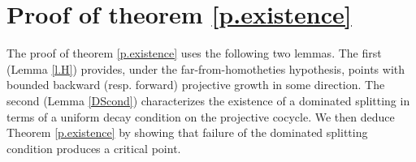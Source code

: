 \documentclass[a4paper,11pt]{article}
\theoremstyle{definition}
\def\noi{\noindent}
\begin{document}






\section{Proof of theorem \ref{p.existence}}
\label{proof-existence}


The proof of theorem \ref{p.existence}  uses the  following two lemmas. The first (Lemma \ref{l.H}) provides, under the far-from-homotheties hypothesis, points with bounded backward (resp. forward) projective growth in some direction. The second (Lemma \ref{DScond}) characterizes the existence of a dominated splitting in terms of a uniform decay condition on the projective cocycle. We then deduce Theorem \ref{p.existence} by showing that failure of the dominated splitting condition produces a critical point.
\end{document}
